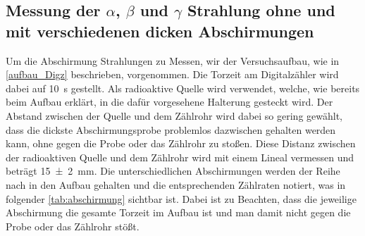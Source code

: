 \documentclass[12pt,english,ngerman]{scrartcl}
\begin{document}
\subsection{Messung der \texorpdfstring{$\alpha$}{alpha}, \texorpdfstring{$\beta$}{beta} und
	\texorpdfstring{$\gamma$}{gamma} Strahlung ohne und mit verschiedenen dicken Abschirmungen}

Um die Abschirmung Strahlungen zu Messen, wir der Versuchsaufbau, wie in
\autoref{aufbau_Digz} beschrieben, vorgenommen. Die Torzeit am Digitalzähler
wird dabei auf \SI{10}{\second} gestellt. Als radioaktive Quelle wird
 verwendet, welche, wie bereits beim Aufbau erklärt, in die
dafür vorgesehene Halterung gesteckt wird. Der Abstand zwischen der Quelle und
dem Zählrohr wird dabei so gering gewählt, dass die dickste Abschirmungsprobe
problemlos dazwischen gehalten werden kann, ohne gegen die Probe oder das
Zählrohr zu stoßen. Diese Distanz zwischen der radioaktiven Quelle und dem
Zählrohr wird mit einem Lineal vermessen und beträgt \SI{15(2)}{\mm}. Die
unterschiedlichen Abschirmungen werden der Reihe nach in den Aufbau gehalten
und die entsprechenden Zählraten notiert, was in folgender
\autoref{tab:abschirmung} sichtbar ist. Dabei ist zu Beachten, dass die
jeweilige Abschirmung die gesamte Torzeit im Aufbau ist und man damit nicht
gegen die Probe oder das Zählrohr stößt.

\begin{table}[H]
	\caption[Erhaltene Zählraten bei verschiedenen Abschirmungsmaterialien]{Erhaltene Zählraten bei
		verschiedenen Abschirmungsmaterialien bei einer Torzeit von \SI{10}{\second} und einem
		Abstand der radioaktiven Quelle von \SI{15(2)}{\mm}. Zählraten sind exakt.\\
		\(z_{Luft} \dots\) erhaltene Zählrate ohne Abschirmung \\
		\(z_{\mathrm{Papier}} \dots\) erhaltene Zählrate mit einem Blatt Papier als Abschirmung \\
		\(z_{\mathrm{Lineal}} \dots\) erhaltene Zählrate mit einem Lineal als Abschirmung (Dicke = \SI{2.1(0.05)}{\mm})\\
		\(z_{\mathrm{CD}} \dots\) erhaltene Zählrate mit einer CD und zugehörigen Soulcase als Abschirmung \\
		\(z_{\mathrm{Alu \num{0.4}}} \dots\) erhaltene Zählrate mit mit einem Aluminiumblech als Abschirmung, Dicke = \SI{0.4(0.05)}{\mm}\\
		\(z_{\mathrm{Alu \num{0.8}}} \dots\) erhaltene Zählrate mit mit einem Aluminiumblech als Abschirmung, Dicke = \SI{0.8(0.05)}{\mm}\\
		\(z_{\mathrm{Alu \num{4}}} \dots\) erhaltene Zählrate mit mit einem Aluminiumblech als Abschirmung, Dicke = \SI{4(0.05)}{\mm}\\
	}
	\label{tab:abschirmung}
	\begin{center}
		
	\end{center}
\end{table}
\end{document}
